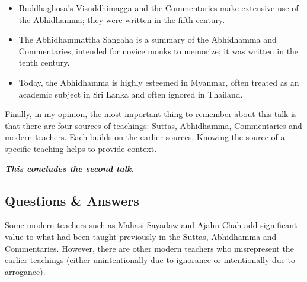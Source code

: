 \begin{itemize}
\begin{itemize}
\end{itemize}

\item Buddhaghosa’s Visuddhimagga and the Commentaries make extensive use of the Abhidhamma; they were written in the fifth century.

\item The Abhidhammattha Sangaha is a summary of the Abhidhamma and Commentaries, intended for novice monks to memorize; it was written in the tenth century.

\item Today, the Abhidhamma is highly esteemed in Myanmar, often treated as an academic subject in Sri Lanka and often ignored in Thailand.

\end{itemize}

Finally, in my opinion, the most important thing to remember about this talk is that there are four sources of teachings: Suttas, Abhidhamma, Commentaries and modern teachers. Each builds on the earlier sources. Knowing the source of a specific teaching helps to provide context.

\begin{center}
\textbf{\textit{This concludes the second talk.}} \\
\end{center}

\newpage

\subsection*{Questions \& Answers}


Some modern teachers such as Mahasi Sayadaw and Ajahn Chah add significant value to what had been taught previously in the Suttas, Abhidhamma and Commentaries. However, there are other modern teachers who misrepresent the earlier teachings (either unintentionally due to ignorance or intentionally due to arrogance). 


